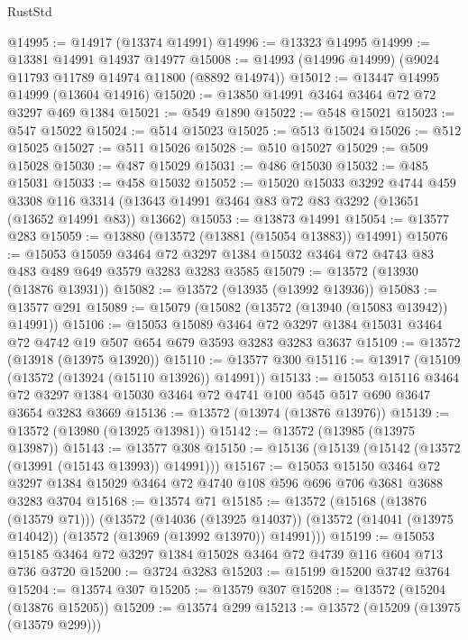 \begin{lexlean}{RustStd}
\begin{coremodule}
@14995 := @14917 (@13374 @14991)
@14996 := @13323 @14995
@14999 := @13381 @14991 @14937 @14977
@15008 := @14993 (@14996 @14999) (@9024 @11793 @11789 @14974 @11800 (@8892 @14974))
@15012 := @13447 @14995 @14999 (@13604 @14916)
@15020 := @13850 @14991 @3464 @3464 @72 @72 @3297 @469 @1384
@15021 := @549 @1890
@15022 := @548 @15021
@15023 := @547 @15022
@15024 := @514 @15023
@15025 := @513 @15024
@15026 := @512 @15025
@15027 := @511 @15026
@15028 := @510 @15027
@15029 := @509 @15028
@15030 := @487 @15029
@15031 := @486 @15030
@15032 := @485 @15031
@15033 := @458 @15032
@15052 := @15020
    @15033
    @3292
    @4744
    @459
    @3308
    @116
    @3314
    (@13643 @14991 @3464 @83 @72 @83 @3292 (@13651 (@13652 @14991 @83)) @13662)
@15053 := @13873 @14991
@15054 := @13577 @283
@15059 := @13880 (@13572 (@13881 (@15054 @13883)) @14991)
@15076 := @15053
    @15059
    @3464
    @72
    @3297
    @1384
    @15032
    @3464
    @72
    @4743
    @83
    @483
    @489
    @649
    @3579
    @3283
    @3283
    @3585
@15079 := @13572 (@13930 (@13876 @13931))
@15082 := @13572 (@13935 (@13992 @13936))
@15083 := @13577 @291
@15089 := @15079 (@15082 (@13572 (@13940 (@15083 @13942)) @14991))
@15106 := @15053
    @15089
    @3464
    @72
    @3297
    @1384
    @15031
    @3464
    @72
    @4742
    @19
    @507
    @654
    @679
    @3593
    @3283
    @3283
    @3637
@15109 := @13572 (@13918 (@13975 @13920))
@15110 := @13577 @300
@15116 := @13917 (@15109 (@13572 (@13924 (@15110 @13926)) @14991))
@15133 := @15053
    @15116
    @3464
    @72
    @3297
    @1384
    @15030
    @3464
    @72
    @4741
    @100
    @545
    @517
    @690
    @3647
    @3654
    @3283
    @3669
@15136 := @13572 (@13974 (@13876 @13976))
@15139 := @13572 (@13980 (@13925 @13981))
@15142 := @13572 (@13985 (@13975 @13987))
@15143 := @13577 @308
@15150 := @15136 (@15139 (@15142 (@13572 (@13991 (@15143 @13993)) @14991)))
@15167 := @15053
    @15150
    @3464
    @72
    @3297
    @1384
    @15029
    @3464
    @72
    @4740
    @108
    @596
    @696
    @706
    @3681
    @3688
    @3283
    @3704
@15168 := @13574 @71
@15185 := @13572
    (@15168 (@13876 (@13579 @71)))
    (@13572
      (@14036 (@13925 @14037))
      (@13572 (@14041 (@13975 @14042)) (@13572 (@13969 (@13992 @13970)) @14991)))
@15199 := @15053 @15185 @3464 @72 @3297 @1384 @15028 @3464 @72 @4739 @116 @604 @713 @736 @3720
@15200 := @3724 @3283
@15203 := @15199 @15200 @3742 @3764
@15204 := @13574 @307
@15205 := @13579 @307
@15208 := @13572 (@15204 (@13876 @15205))
@15209 := @13574 @299
@15213 := @13572 (@15209 (@13975 (@13579 @299)))

\end{coremodule}
\end{lexlean}
